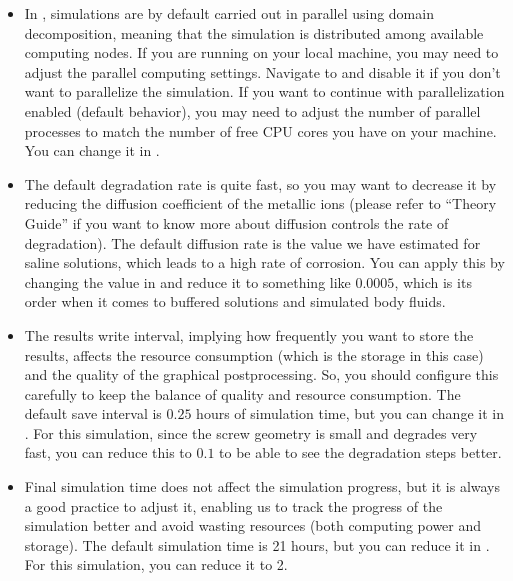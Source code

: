 \begin{itemize}
\item
In \biodeg{}, simulations are by default carried out in parallel using domain decomposition, meaning that the simulation is distributed among available computing nodes. If you are running \biodeg{} on your local machine, you may need to adjust the parallel computing settings. Navigate to  and disable it if you don't want to parallelize the simulation. If you want to continue with parallelization enabled (default behavior), you may need to adjust the number of parallel processes to match the number of free CPU cores you have on your machine. You can change it in .
\item
The default degradation rate is quite fast, so you may want to decrease it by reducing the diffusion coefficient of the metallic ions (please refer to ``Theory Guide'' if you want to know more about diffusion controls the rate of degradation). The default diffusion rate is the value we have estimated for saline solutions, which leads to a high rate of corrosion. You can apply this by changing the value in  and reduce it to something like $0.0005$, which is its order when it comes to buffered solutions and simulated body fluids.
\item
The results write interval, implying how frequently you want to store the results, affects the resource consumption (which is the storage in this case) and the quality of the graphical postprocessing. So, you should configure this carefully to keep the balance of quality and resource consumption. The default save interval is $0.25$ hours of simulation time, but you can change it in . For this simulation, since the screw geometry is small and degrades very fast, you can reduce this to $0.1$ to be able to see the degradation steps better.
\item
Final simulation time does not affect the simulation progress, but it is always a good practice to adjust it, enabling us to track the progress of the simulation better and avoid wasting resources (both computing power and storage). The default simulation time is 21 hours, but you can reduce it in . For this simulation, you can reduce it to 2.
\end{itemize}

